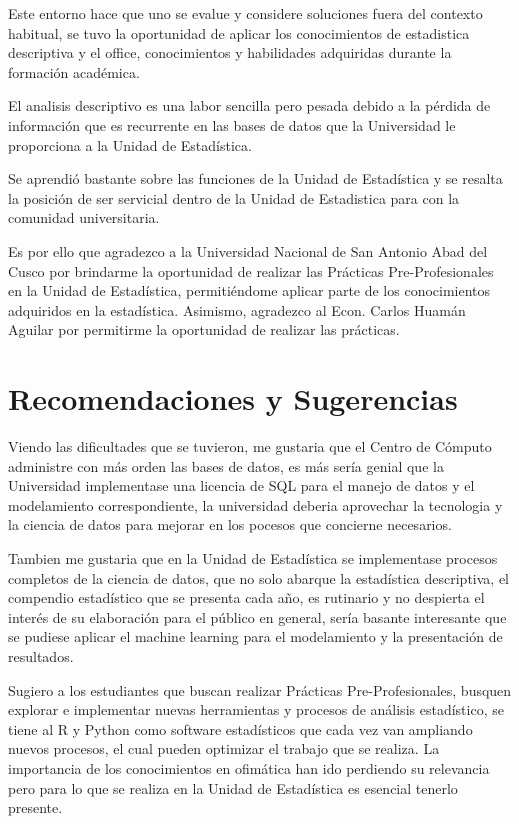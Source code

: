 \documentclass[
  12pt,
  letterpaper,
]{scrreprt}
\begin{document}
Este entorno hace que uno se evalue y considere soluciones fuera del
contexto habitual, se tuvo la oportunidad de aplicar los conocimientos
de estadistica descriptiva y el office, conocimientos y habilidades
adquiridas durante la formación académica.

El analisis descriptivo es una labor sencilla pero pesada debido a la
pérdida de información que es recurrente en las bases de datos que la
Universidad le proporciona a la Unidad de Estadística.

Se aprendió bastante sobre las funciones de la Unidad de Estadística y
se resalta la posición de ser servicial dentro de la Unidad de
Estadistica para con la comunidad universitaria.

Es por ello que agradezco a la Universidad Nacional de San Antonio Abad
del Cusco por brindarme la oportunidad de realizar las Prácticas
Pre-Profesionales en la Unidad de Estadística, permitiéndome aplicar
parte de los conocimientos adquiridos en la estadística. Asimismo,
agradezco al Econ. Carlos Huamán Aguilar por permitirme la oportunidad
de realizar las prácticas.


\chapter{Recomendaciones y
Sugerencias}\label{recomendaciones-y-sugerencias}

Viendo las dificultades que se tuvieron, me gustaria que el Centro de
Cómputo administre con más orden las bases de datos, es más sería genial
que la Universidad implementase una licencia de SQL para el manejo de
datos y el modelamiento correspondiente, la universidad deberia
aprovechar la tecnologia y la ciencia de datos para mejorar en los
pocesos que concierne necesarios.

Tambien me gustaria que en la Unidad de Estadística se implementase
procesos completos de la ciencia de datos, que no solo abarque la
estadística descriptiva, el compendio estadístico que se presenta cada
año, es rutinario y no despierta el interés de su elaboración para el
público en general, sería basante interesante que se pudiese aplicar el
machine learning para el modelamiento y la presentación de resultados.

Sugiero a los estudiantes que buscan realizar Prácticas
Pre-Profesionales, busquen explorar e implementar nuevas herramientas y
procesos de análisis estadístico, se tiene al R y Python como software
estadísticos que cada vez van ampliando nuevos procesos, el cual pueden
optimizar el trabajo que se realiza. La importancia de los conocimientos
en ofimática han ido perdiendo su relevancia pero para lo que se realiza
en la Unidad de Estadística es esencial tenerlo presente.
\end{document}
